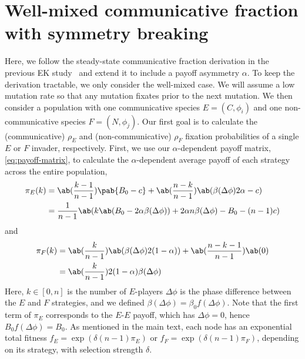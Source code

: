 \section{Well-mixed communicative fraction with symmetry breaking}
Here, we follow the steady-state communicative fraction derivation
in the previous EK study~\citep{tripp2022evolutionary}
and extend it to include a payoff asymmetry $\alpha$.
To keep the derivation tractable,
we only consider the well-mixed case.
We will assume a low mutation rate
so that any mutation fixates prior to the next mutation.
We then consider a population with one communicative species $E = (C, \phi_i)$
and one non-communicative species $F = (N, \phi_j)$.
Our first goal is to calculate
the (communicative) $\rho_E$ and (non-communicative) $\rho_F$
fixation probabilities of a single $E$ or $F$ invader, respectively.
First, we use our $\alpha$-dependent payoff matrix, \cref{eq:payoff-matrix},
to calculate the $\alpha$-dependent average payoff
of each strategy across the entire population,
\begin{align}
  \pi_E(k) &= \ab(\frac{k-1}{n-1}) \pab{B_0 - c}
                + \ab(\frac{n-k}{n-1}) \ab(\beta(\Delta\phi) 2\alpha - c) \\
           &= \frac{1}{n-1}
               \ab(k \ab(B_0 - 2 \alpha \beta(\Delta\phi))
                 + 2 \alpha n \beta(\Delta\phi) - B_0 - (n-1) c)
\end{align}
and
\begin{align}
  \pi_F(k) &= \ab(\frac{k}{n-1}) \ab(\beta(\Delta\phi) 2 (1-\alpha))
                + \ab(\frac{n-k-1}{n-1}) \ab(0) \\
           &= \ab(\frac{k}{n-1}) 2 (1-\alpha) \beta(\Delta\phi)
\end{align}
Here, $k \in [0,n]$ is the number of $E$-players
$\Delta \phi$ is the phase difference between the $E$ and $F$
strategies,
and we defined $\beta(\Delta \phi) = \beta_0 f(\Delta \phi)$.
Note that the first term of $\pi_E$ corresponds
to the $E$-$E$ payoff, which has $\Delta \phi = 0$,
hence $B_0 f(\Delta \phi) = B_0$.
As mentioned in the main text,
each node has an exponential total fitness
$f_E = \exp(\delta (n-1) \pi_E)$
or
$f_F = \exp(\delta (n-1) \pi_F)$,
depending on its strategy,
with selection strength $\delta$.

